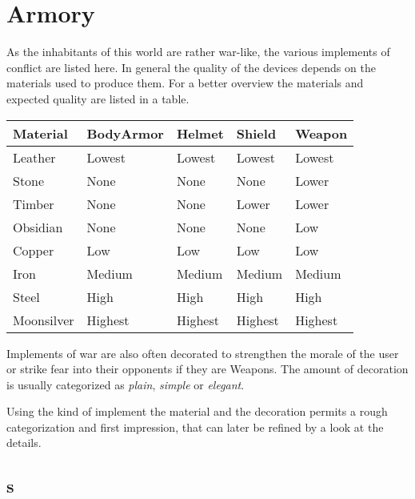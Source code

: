 \section{Armory}\label{ch:Goods:Armory}

As the inhabitants of this world are rather war-like, the various implements of
conflict are listed here. In general the quality of the devices depends on the
materials used to produce them. For a better overview the materials and
expected quality are listed in a table.

\begin{longtable}{lllll}
	\toprule
	Material         & \Gls{BodyArmor} & \Gls{Helmet} & \Gls{Shield} & \Gls{Weapon} \\
	\midrule
	\Gls{Leather}    & Lowest          & Lowest       & Lowest       & Lowest       \\
	\Gls{Stone}      & None            & None         & None         & Lower        \\
	\Gls{Timber}     & None            & None         & Lower        & Lower        \\
	\Gls{Obsidian}   & None            & None         & None         & Low          \\
	\Gls{Copper}     & Low             & Low          & Low          & Low          \\
	\Gls{Iron}       & Medium          & Medium       & Medium       & Medium       \\
	\Gls{Steel}      & High            & High         & High         & High         \\ %
	\Gls{Moonsilver} & Highest         & Highest      & Highest      & Highest      \\
	\bottomrule
\end{longtable}

Implements of war are also often decorated to strengthen the morale of the user
or strike fear into their opponents if they are \glspl{Weapon}. The amount of
decoration is usually categorized as \emph{plain}, \emph{simple} or
\emph{elegant}.

Using the kind of implement the material and the decoration permits a rough
categorization and first impression, that can later be refined by a look at the
details.

\subsection{s}\label{ch:Goods:Armory:Weapons}

